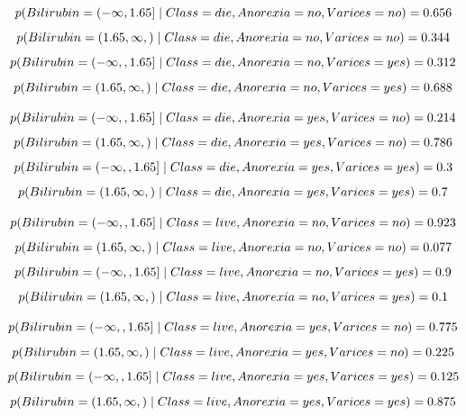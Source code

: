 \documentclass[es]{ifirak}
\begin{document}
$$p (Bilirubin= (-\infty, 1.65] \hspace{0.1cm} |\hspace{0.1cm} Class=die , Anorexia=no, Varices=no) = 0.656$$
$$p (Bilirubin= (1.65, \infty,)  \hspace{0.1cm}|\hspace{0.1cm} Class=die , Anorexia=no, Varices=no) = 0.344$$
$$p (Bilirubin= (-\infty,, 1.65]  \hspace{0.1cm}| \hspace{0.1cm}Class=die , Anorexia=no, Varices=yes) = 0.312$$
$$p (Bilirubin= (1.65, \infty,)  \hspace{0.1cm}|\hspace{0.1cm} Class=die , Anorexia=no, Varices=yes )= 0.688$$

$$p (Bilirubin= (-\infty,, 1.65] \hspace{0.1cm} |\hspace{0.1cm} Class=die , Anorexia=yes, Varices=no) = 0.214$$
$$p (Bilirubin= (1.65, \infty,) \hspace{0.1cm} |\hspace{0.1cm} Class=die , Anorexia=yes, Varices=no) = 0.786$$
$$p (Bilirubin= (-\infty,, 1.65] \hspace{0.1cm}|\hspace{0.1cm} Class=die , Anorexia=yes, Varices=yes) = 0.3$$
$$p (Bilirubin= (1.65, \infty,)  \hspace{0.1cm}|\hspace{0.1cm} Class=die , Anorexia=yes, Varices=yes) = 0.7$$

$$p (Bilirubin= (-\infty,, 1.65]  \hspace{0.1cm}|\hspace{0.1cm} Class=live , Anorexia=no, Varices=no) = 0.923$$
$$p (Bilirubin= (1.65, \infty,)  \hspace{0.1cm}|\hspace{0.1cm} Class=live , Anorexia=no, Varices=no) = 0.077$$
$$p (Bilirubin= (-\infty,, 1.65] \hspace{0.1cm} |\hspace{0.1cm} Class=live , Anorexia=no, Varices=yes) = 0.9$$
$$p (Bilirubin= (1.65, \infty,)  \hspace{0.1cm}|\hspace{0.1cm} Class=live , Anorexia=no, Varices=yes) = 0.1$$

$$p (Bilirubin= (-\infty,, 1.65] \hspace{0.1cm} | \hspace{0.1cm}Class=live , Anorexia=yes, Varices=no) = 0.775$$
$$p (Bilirubin= (1.65, \infty,)  \hspace{0.1cm}|\hspace{0.1cm} Class=live , Anorexia=yes, Varices=no) = 0.225$$
$$p (Bilirubin= (-\infty,, 1.65] \hspace{0.1cm} |\hspace{0.1cm} Class=live , Anorexia=yes, Varices=yes) = 0.125$$
$$p (Bilirubin= (1.65, \infty,)  \hspace{0.1cm}|\hspace{0.1cm} Class=live , Anorexia=yes, Varices=yes) = 	0.875$$
\end{document}
